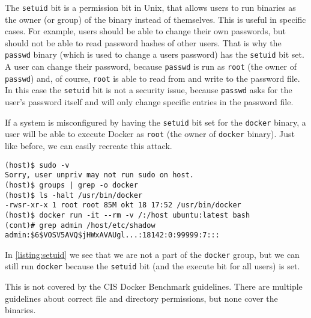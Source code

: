 The \lstinline{setuid} bit is a permission bit in Unix, that allows users to run binaries as the owner (or group) of the binary instead of themselves.
This is useful in specific cases. For example, users should be able to change their own passwords, but should not be able to read password hashes of other users. That is why the \lstinline{passwd} binary (which is used to change a users password) has the \lstinline{setuid} bit set. A user can change their password, because \lstinline{passwd} is run as \lstinline{root} (the owner of \lstinline{passwd}) and, of course, \lstinline{root} is able to read from and write to the password file. In this case the \lstinline{setuid} bit is not a security issue, because \lstinline{passwd} asks for the user's password itself and will only change specific entries in the password file.

\medskip

If a system is misconfigured by having the \lstinline{setuid} bit set for the \lstinline{docker} binary, a user will be able to execute Docker as \lstinline{root} (the owner of \lstinline{docker} binary). Just like before, we can easily recreate this attack.

\begin{lstlisting}[caption={Docker \lstinline{setuid} exploit example.},captionpos=b, label={listing:setuid}]
(host)$ sudo -v
Sorry, user unpriv may not run sudo on host.
(host)$ groups | grep -o docker
(host)$ ls -halt /usr/bin/docker
-rwsr-xr-x 1 root root 85M okt 18 17:52 /usr/bin/docker
(host)$ docker run -it --rm -v /:/host ubuntu:latest bash
(cont)# grep admin /host/etc/shadow
admin:$6$VOSV5AVQ$jHWxAVAUgl...:18142:0:99999:7:::
\end{lstlisting}

In \autoref{listing:setuid} we see that we are not a part of the \lstinline{docker} group, but we can still run \lstinline{docker} because the \lstinline{setuid} bit (and the execute bit for all users) is set.

\medskip

This is not covered by the CIS Docker Benchmark guidelines. There are multiple guidelines about correct file and directory permissions, but none cover the binaries.
